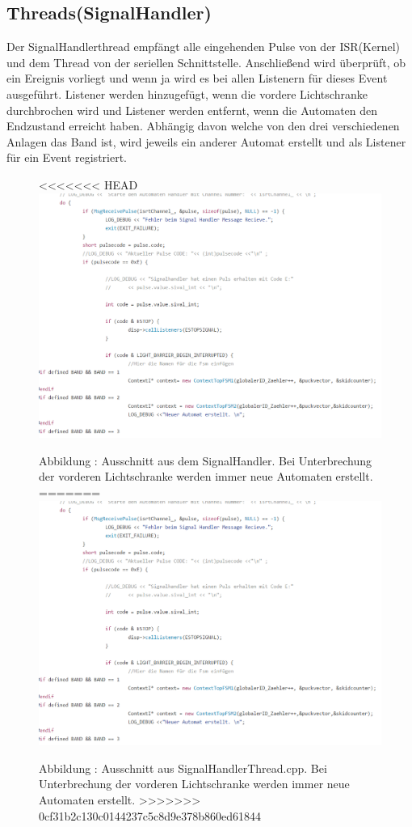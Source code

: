 \documentclass[a4paper, 11pt]{article}
\begin{document}
\subsection{Threads(SignalHandler)}
Der SignalHandlerthread empfängt alle eingehenden Pulse von der ISR(Kernel) und dem Thread von der seriellen Schnittstelle. Anschließend wird überprüft, ob ein Ereignis vorliegt und wenn ja wird es bei allen Listenern für dieses Event ausgeführt. Listener werden hinzugefügt, wenn die vordere Lichtschranke durchbrochen wird und Listener werden entfernt, wenn die Automaten den Endzustand erreicht haben. Abhängig davon welche von den drei verschiedenen Anlagen das Band ist, wird jeweils ein anderer Automat erstellt und als Listener für ein Event registriert.

\begin{figure}[H]
\centering 
<<<<<<< HEAD
    \includegraphics[scale=0.7]{ISR/sighandler.png}
    
    \small Abbildung \theimgcounter : Ausschnitt aus dem SignalHandler. Bei Unterbrechung der vorderen Lichtschranke werden immer neue Automaten erstellt.
=======
    \includegraphics[scale=0.5]{ISR/sighandler.png}
    
    \small Abbildung \theimgcounter : Ausschnitt aus SignalHandlerThread.cpp. Bei Unterbrechung der vorderen Lichtschranke werden immer neue Automaten erstellt.
>>>>>>> 0cf31b2c130c0144237c5c8d9e378b860ed61844
    \label{sighandler}
\end{figure}
\end{document}
